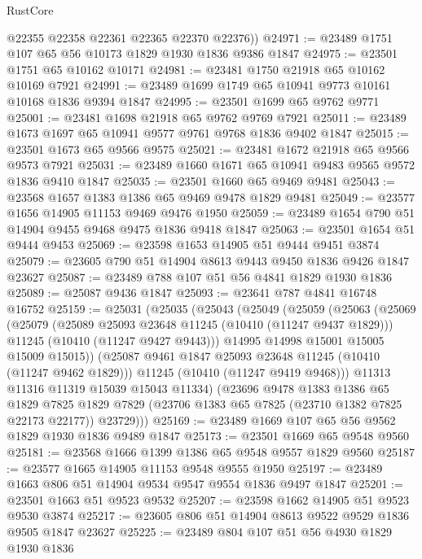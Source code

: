 \begin{lexlean}{RustCore}
\begin{coremodule}
        @22355
        @22358
        @22361
        @22365
        @22370
        @22376))
@24971 := @23489 @1751 @107 @65 @56 @10173 @1829 @1930 @1836 @9386 @1847
@24975 := @23501 @1751 @65 @10162 @10171
@24981 := @23481 @1750 @21918 @65 @10162 @10169 @7921
@24991 := @23489 @1699 @1749 @65 @10941 @9773 @10161 @10168 @1836 @9394 @1847
@24995 := @23501 @1699 @65 @9762 @9771
@25001 := @23481 @1698 @21918 @65 @9762 @9769 @7921
@25011 := @23489 @1673 @1697 @65 @10941 @9577 @9761 @9768 @1836 @9402 @1847
@25015 := @23501 @1673 @65 @9566 @9575
@25021 := @23481 @1672 @21918 @65 @9566 @9573 @7921
@25031 := @23489 @1660 @1671 @65 @10941 @9483 @9565 @9572 @1836 @9410 @1847
@25035 := @23501 @1660 @65 @9469 @9481
@25043 := @23568 @1657 @1383 @1386 @65 @9469 @9478 @1829 @9481
@25049 := @23577 @1656 @14905 @11153 @9469 @9476 @1950
@25059 := @23489 @1654 @790 @51 @14904 @9455 @9468 @9475 @1836 @9418 @1847
@25063 := @23501 @1654 @51 @9444 @9453
@25069 := @23598 @1653 @14905 @51 @9444 @9451 @3874
@25079 := @23605 @790 @51 @14904 @8613 @9443 @9450 @1836 @9426 @1847 @23627
@25087 := @23489 @788 @107 @51 @56 @4841 @1829 @1930 @1836
@25089 := @25087 @9436 @1847
@25093 := @23641 @787 @4841 @16748 @16752
@25159 := @25031
    (@25035
      (@25043
        (@25049
          (@25059
            (@25063
              (@25069
                (@25079
                  (@25089 @25093 @23648 @11245 (@10410 (@11247 @9437 @1829)))
                  @11245
                  (@10410 (@11247 @9427 @9443)))
                @14995
                @14998
                @15001
                @15005
                @15009
                @15015))
            (@25087 @9461 @1847 @25093 @23648 @11245 (@10410 (@11247 @9462 @1829)))
            @11245
            (@10410 (@11247 @9419 @9468)))
          @11313
          @11316
          @11319
          @15039
          @15043
          @11334)
        (@23696
          @9478
          @1383
          @1386
          @65
          @1829
          @7825
          @1829
          @7829
          (@23706 @1383 @65 @7825 (@23710 @1382 @7825 @22173 @22177))
          @23729)))
@25169 := @23489 @1669 @107 @65 @56 @9562 @1829 @1930 @1836 @9489 @1847
@25173 := @23501 @1669 @65 @9548 @9560
@25181 := @23568 @1666 @1399 @1386 @65 @9548 @9557 @1829 @9560
@25187 := @23577 @1665 @14905 @11153 @9548 @9555 @1950
@25197 := @23489 @1663 @806 @51 @14904 @9534 @9547 @9554 @1836 @9497 @1847
@25201 := @23501 @1663 @51 @9523 @9532
@25207 := @23598 @1662 @14905 @51 @9523 @9530 @3874
@25217 := @23605 @806 @51 @14904 @8613 @9522 @9529 @1836 @9505 @1847 @23627
@25225 := @23489 @804 @107 @51 @56 @4930 @1829 @1930 @1836

\end{coremodule}
\end{lexlean}
